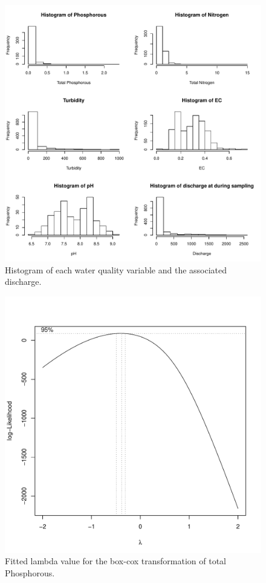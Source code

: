 \documentclass[5p]{elsarticle}
\begin{document}
\begin{center}
\begin{figure}[h]
\includegraphics[scale=0.5]{histograms.pdf}
\caption{Histogram of each water quality variable and the associated discharge.}
\label{fig:histograms}
\end{figure}
\end{center}

\begin{center}
\begin{figure}
\includegraphics[scale=0.45]{bc_example_tp.pdf}
\caption{Fitted lambda value for the box-cox transformation of total Phosphorous.}
\label{fig:lambda_example}
\end{figure}
\end{center}
\end{document}
